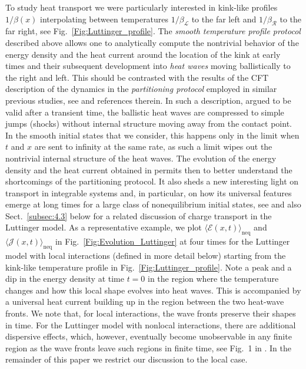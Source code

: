 \documentclass[12pt,a4paper]{article}
\newcommand{\cE}{\mathcal{E}}
\newcommand{\cJ}{\mathcal{J}}
\newcommand{\cL}{\mathcal{L}}
\newcommand{\cR}{\mathcal{R}}
\theoremstyle{definition}
\theoremstyle{remark}
\begin{document}
To study heat transport we were particularly interested in kink-like profiles $1/\beta(x)$ interpolating between temperatures $1/\beta_{\cL}$ to the far left and $1/\beta_{\cR}$ to the far right, see Fig.~\ref{Fig:Luttinger_profile}.
The {\it smooth temperature profile protocol} described above allows one to analytically compute the nontrivial behavior of the energy density and the heat current around the location of the kink at early times and their subsequent development into {\it heat waves} moving ballistically to the right and left.
This should be contrasted with the results of the CFT description of the dynamics in the {\it partitioning protocol} employed in similar previous studies, see \cite{BeDo3} and references therein.
In such a description, argued to be valid after a transient time, the ballistic heat waves are compressed to simple jumps (shocks) without internal structure moving away from the contact point. In the smooth initial states that we
consider, this happens only in the limit when $t$ and $x$ are sent to infinity
at the same rate, as such a limit wipes out the nontrivial internal structure
of the heat waves. The evolution of the energy density and the heat current
obtained in \cite{LLMM2} permits then to better understand the shortcomings
of the partitioning protocol.
It also sheds a new interesting light on transport in integrable systems and, in particular, on how its universal features \cite{ViRi} emerge at long times
for a large class of nonequilibrium initial states, see \cite{LLMM1} and also
Sect.~\ref{subsec:4.3} below for a related discussion of charge transport
in the Luttinger model. 
As a representative example, we plot $\langle \cE(x,t) \rangle_{\text{neq}}$ and $\langle\cJ(x,t)\rangle_{\text{neq}}$ in Fig.~\ref{Fig:Evolution_Luttinger} at four times for the Luttinger model with local interactions (defined in more detail below) starting from the kink-like temperature profile in Fig.~\ref{Fig:Luttinger_profile}.
Note a peak and a dip in the energy density at time $t=0$ in the region where the temperature changes and how this local shape evolves into heat waves.
This is accompanied by a universal heat current building up in the region between the two heat-wave fronts.
We note that, for local interactions, the wave fronts preserve their shapes in time.
For the Luttinger model with nonlocal interactions, there are additional dispersive effects, which, however,
eventually become unobservable in any finite region as the wave fronts
leave such regions in finite time, see Fig.~1 in \cite{LLMM2}.
In the remainder of this paper we restrict our discussion to the local case.
\end{document}
